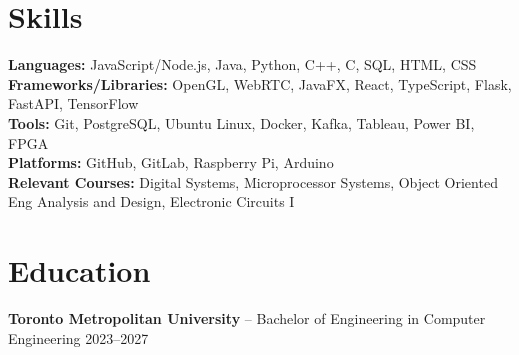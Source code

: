 \documentclass[11pt]{article}
\begin{document}
\section*{Skills}
\textbf{Languages:} JavaScript/Node.js, Java, Python, C++, C, SQL, HTML, CSS \\
\textbf{Frameworks/Libraries:} OpenGL, WebRTC, JavaFX, React, TypeScript, Flask, FastAPI, TensorFlow \\
\textbf{Tools:} Git, PostgreSQL, Ubuntu Linux, Docker, Kafka, Tableau, Power BI, FPGA \\
\textbf{Platforms:} GitHub, GitLab, Raspberry Pi, Arduino \\
\textbf{Relevant Courses:} Digital Systems, Microprocessor Systems, Object Oriented Eng Analysis and Design, Electronic Circuits I

\section*{Education}
\textbf{Toronto Metropolitan University} -- Bachelor of Engineering in Computer Engineering \hfill 2023--2027
\end{document}

